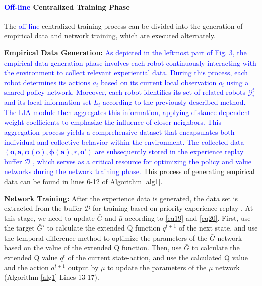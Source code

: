 \documentclass[lettersize,journal]{IEEEtran}
\newcommand{\blue}[1]{\textcolor{blue}{#1}}
\begin{document}
\paragraph{\textbf{\blue{Off-line} Centralized Training Phase}}\label{subsection b.a}

The \blue{off-line} centralized training process can be divided into the generation of empirical data and network training, which are executed alternately. 

\textbf{Empirical Data Generation:} \blue{As depicted in the leftmost part of Fig. 3, the empirical data generation phase involves each robot continuously interacting with the environment to collect relevant experiential data. During this process, each robot determines its actions $a_i$ based on its current local observation $o_i$ using a shared policy network. Moreover, each robot identifies its set of related robots $\mathcal{G}_{i}^t$ and its local information set $L_i$ according to the previously described method. The LIA module then aggregates this information, applying distance-dependent weight coefficients to emphasize the influence of closer neighbors. This aggregation process yields a comprehensive dataset that encapsulates both individual and collective behavior within the environment. The collected data $(\bm{o}, \bm{a}, \bm{\phi}(\bm{o}), \bm{\phi}(\bm{a}), r, \bm{o}')$ are subsequently stored in the experience replay buffer $\mathcal{D}$ , which serves as a critical resource for optimizing the policy and value networks during the network training phase.} This process of generating empirical data can be found in lines 6-12 of Algorithm \ref{alg1}.


\textbf{Network Training:} After the experience data is generated, the data set is extracted from the buffer $\mathcal{D}$ for training based on priority experience replay \cite{schaul2015prioritized}. At this stage, we need to update $\bar{G}$ and $\bar{\mu}$ according to \eqref{eq19} and \eqref{eq20}. First, use the target $\bar{G}'$ to calculate the extended Q function $q^{t+1}$ of the next state, and use the temporal difference method to optimize the parameters of the $\bar{G}$ network based on the value of the extended Q function. Then, use $\bar{G}$ to calculate the extended Q value $q^{t}$ of the current state-action, and use the calculated Q value and the action $a^{t+1}$ output by $\bar{\mu}$ to update the parameters of the $\bar{\mu}$ network (Algorithm \ref{alg1} Lines 13-17).
\end{document}
